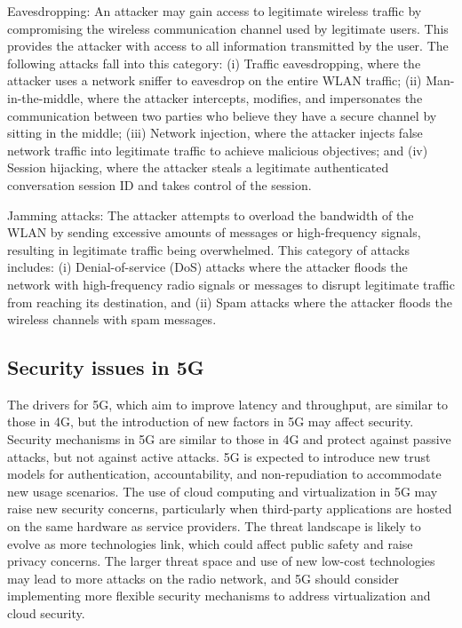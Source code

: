 \documentclass[conference]{IEEEtran}
\begin{document}
Eavesdropping: An attacker may gain access to legitimate wireless traffic by compromising the wireless communication channel used by legitimate users. This provides the attacker with access to all information transmitted by the user. The following attacks fall into this category: (i) Traffic eavesdropping, where the attacker uses a network sniffer to eavesdrop on the entire WLAN traffic; (ii) Man-in-the-middle, where the attacker intercepts, modifies, and impersonates the communication between two parties who believe they have a secure channel by sitting in the middle; (iii) Network injection, where the attacker injects false network traffic into legitimate traffic to achieve malicious objectives; and (iv) Session hijacking, where the attacker steals a legitimate authenticated conversation session ID and takes control of the session.

Jamming attacks: The attacker attempts to overload the bandwidth of the WLAN by sending excessive amounts of messages or high-frequency signals, resulting in legitimate traffic being overwhelmed. This category of attacks includes: (i) Denial-of-service (DoS) attacks where the attacker floods the network with high-frequency radio signals or messages to disrupt legitimate traffic from reaching its destination, and (ii) Spam attacks where the attacker floods the wireless channels with spam messages.

\subsection{Security issues in 5G}
The drivers for 5G, which aim to improve latency and throughput, are similar to those in 4G, but the introduction of new factors in 5G may affect security.
Security mechanisms in 5G are similar to those in 4G and protect against passive attacks, but not against active attacks.
5G is expected to introduce new trust models for authentication, accountability, and non-repudiation to accommodate new usage scenarios.
The use of cloud computing and virtualization in 5G may raise new security concerns, particularly when third-party applications are hosted on the same hardware as service providers.
The threat landscape is likely to evolve as more technologies link, which could affect public safety and raise privacy concerns.
The larger threat space and use of new low-cost technologies may lead to more attacks on the radio network, and 5G should consider implementing more flexible security mechanisms to address virtualization and cloud security.
\end{document}
